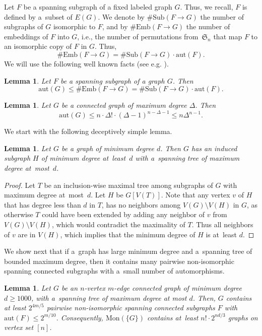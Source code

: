 \documentclass[letterpaper,11pt]{article}
\newtheorem{lemma}[theorem]{Lemma}
\theoremstyle{definition}
\theoremstyle{remark}
\newcommand{\mon}{\mathrm{Mon}}
\newcommand{\aut}{\mathrm{aut}}
\newcommand{\sub}{\#\mathrm{Sub}}
\newcommand{\emb}{\#\mathrm{Emb}}
\renewcommand{\leq}{\leqslant}
\renewcommand{\geq}{\geqslant}
\begin{document}
	Let $F$ be a spanning subgraph of a fixed labeled graph $G$.
        Thus, we recall, $F$ is defined by a~subset of $E(G)$.
	We denote by $\sub(F \rightarrow G)$ the number of subgraphs of $G$ isomorphic to $F$, and by $\emb(F \rightarrow G)$ the number of embeddings of $F$ into $G$, i.e., the number of permutations from~$\mathfrak S_n$ that map $F$ to an isomorphic copy of $F$ in $G$. 
	Thus, \[\emb(F \rightarrow G) = \sub(F \rightarrow G)\cdot\aut(F).\]
	We will use the following well known facts (see e.g. \cite{KLT02}).
	
	\begin{lemma}\label{lem:autGspanF}
		Let $F$ be a spanning subgraph of a graph $G$. Then 
		\[
			\aut(G) \leq \emb(F \rightarrow G) = \sub(F \rightarrow G)\cdot\aut(F).
		\]
	\end{lemma}
	
	\begin{lemma}\label{lem:autGdeg}
		Let $G$ be a connected graph of maximum degree $\Delta$.
		Then 
		\[
		\aut(G) \leq n \cdot \Delta! \cdot (\Delta-1)^{n-\Delta-1} \leq n \Delta^{n-1}.
		\]
	\end{lemma}
	
	   	
	We start with the following deceptively simple lemma.
        	
	\begin{lemma}\label{lem:minDegSubgraphs}
	  Let $G$ be a graph of minimum degree $d$.
          Then $G$ has an induced subgraph $H$ of minimum degree at~least~$d$ with a~spanning tree of \emph{maximum degree} at~most~$d$.
	\end{lemma}
	\begin{proof}
		Let $T$ be an inclusion-wise maximal tree among subgraphs of $G$ with maximum degree at~most~$d$.
                Let $H$ be $G[V(T)]$.		
		Note that any vertex $v$ of $H$ that has degree less than $d$ in $T$, has no neighbors among $V(G) \setminus V(H)$ in $G$, as otherwise $T$ could have been extended by	adding any neighbor of $v$ from $V(G) \setminus V(H)$, which would contradict the maximality of $T$. 
		Thus all neighbors of $v$ are in $V(H)$, which implies that the minimum degree of $H$ is at~least $d$. 
	\end{proof}

         We show next that if a~graph has large minimum degree and a~spanning tree of bounded maximum degree, then it contains many pairwise non-isomorphic spanning connected subgraphs with a~small number of automorphisms.
	
	\begin{lemma}\label{lem:minDegSubgraphsSpanTree}
	  Let $G$ be an $n$-vertex $m$-edge connected graph of minimum degree $d \geq 1000$, with a~spanning tree of maximum degree at most $d$.
          Then, $G$ contains
		at least $2^{4m/5}$ pairwise non-isomorphic spanning connected subgraphs $F$
		with $\aut(F) \leq 2^{m/10}$. Consequently, $\mon(\{G\})$ contains at~least $n! \cdot 2^{nd/3}$ graphs on vertex set $[n]$.
	\end{lemma}
	
\end{document}
